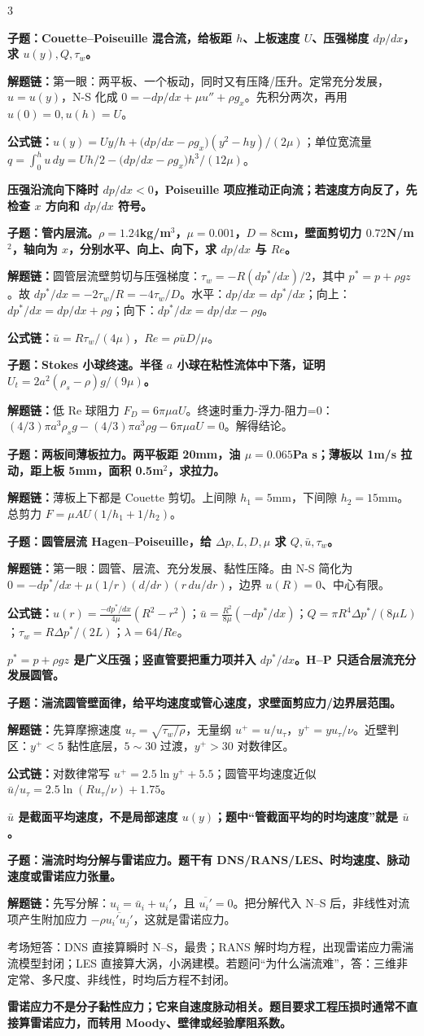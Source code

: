 \documentclass[a4paper]{article}
\newcommand{\qt}[1]{\vspace{0.04pt}\colorbox{Q}{\parbox{\dimexpr\linewidth-2\fboxsep}{\color{white}\bfseries #1}}\par}
\newcommand{\ans}[1]{\colorbox{G}{\parbox{\dimexpr\linewidth-2\fboxsep}{#1}}\par}
\newcommand{\warn}[1]{\colorbox{Y}{\parbox{\dimexpr\linewidth-2\fboxsep}{\color{E}\bfseries #1}}\par}
\newcommand{\chain}[1]{{\color{A}\bfseries 解题链：}#1\par}
\newcommand{\form}[1]{{\color{M}\bfseries 公式链：}#1\par}
\begin{document}
\begin{multicols}{3}
\qt{子题：Couette--Poiseuille 混合流，给板距 $h$、上板速度 $U$、压强梯度 $dp/dx$，求 $u(y),Q,\tau_w$。}
\chain{第一眼：两平板、一个板动，同时又有压降/压升。定常充分发展，$u=u(y)$，N-S 化成 $0=-dp/dx+\mu u''+\rho g_x$。先积分两次，再用 $u(0)=0,u(h)=U$。}
\form{$u(y)=Uy/h+\big(dp/dx-\rho g_x\big)(y^2-hy)/(2\mu)$；单位宽流量 $q=\int_0^hu\,dy=Uh/2-\big(dp/dx-\rho g_x\big)h^3/(12\mu)$。}
\warn{压强沿流向下降时 $dp/dx<0$，Poiseuille 项应推动正向流；若速度方向反了，先检查 $x$ 方向和 $dp/dx$ 符号。}

\qt{子题：管内层流。$\rho=1.24$kg/m$^3$，$\mu=0.001$，$D=8$cm，壁面剪切力 $0.72$N/m$^2$，轴向为 $x$，分别水平、向上、向下，求 $dp/dx$ 与 $Re$。}
\chain{圆管层流壁剪切与压强梯度：$\tau_w=-R(dp^*/dx)/2$，其中 $p^*=p+\rho gz$。故 $dp^*/dx=-2\tau_w/R=-4\tau_w/D$。水平：$dp/dx=dp^*/dx$；向上：$dp^*/dx=dp/dx+\rho g$；向下：$dp^*/dx=dp/dx-\rho g$。}
\form{$\bar u=R\tau_w/(4\mu)$，$Re=\rho\bar uD/\mu$。}

\qt{子题：Stokes 小球终速。半径 $a$ 小球在粘性流体中下落，证明 $U_t=2a^2(\rho_s-\rho)g/(9\mu)$。}
\chain{低 Re 球阻力 $F_D=6\pi\mu aU$。终速时重力-浮力-阻力=0：$(4/3)\pi a^3\rho_sg-(4/3)\pi a^3\rho g-6\pi\mu aU=0$。解得结论。}

\qt{子题：两板间薄板拉力。两平板距 20mm，油 $\mu=0.065$Pa s；薄板以 1m/s 拉动，距上板 5mm，面积 0.5m$^2$，求拉力。}
\chain{薄板上下都是 Couette 剪切。上间隙 $h_1=5$mm，下间隙 $h_2=15$mm。总剪力 $F=\mu AU(1/h_1+1/h_2)$。}

\qt{子题：圆管层流 Hagen--Poiseuille，给 $\Delta p,L,D,\mu$ 求 $Q,\bar u,\tau_w$。}
\chain{第一眼：圆管、层流、充分发展、黏性压降。由 N-S 简化为 $0=-dp^*/dx+\mu(1/r)(d/dr)(r\,du/dr)$，边界 $u(R)=0$、中心有限。}
\form{$u(r)=\frac{-dp^*/dx}{4\mu}(R^2-r^2)$；$\bar u=\frac{R^2}{8\mu}(-dp^*/dx)$；$Q=\pi R^4\Delta p^*/(8\mu L)$；$\tau_w=R\Delta p^*/(2L)$；$\lambda=64/Re$。}
\warn{$p^*=p+\rho gz$ 是广义压强；竖直管要把重力项并入 $dp^*/dx$。H--P 只适合层流充分发展圆管。}

\qt{子题：湍流圆管壁面律，给平均速度或管心速度，求壁面剪应力/边界层范围。}
\chain{先算摩擦速度 $u_\tau=\sqrt{\tau_w/\rho}$，无量纲 $u^+=u/u_\tau$，$y^+=yu_\tau/\nu$。近壁判区：$y^+<5$ 黏性底层，$5\sim30$ 过渡，$y^+>30$ 对数律区。}
\form{对数律常写 $u^+=2.5\ln y^+ +5.5$；圆管平均速度近似 $\bar u/u_\tau=2.5\ln(Ru_\tau/\nu)+1.75$。}
\warn{$\bar u$ 是截面平均速度，不是局部速度 $u(y)$；题中“管截面平均的时均速度”就是 $\bar u$。}

\qt{子题：湍流时均分解与雷诺应力。题干有 DNS/RANS/LES、时均速度、脉动速度或雷诺应力张量。}
\chain{先写分解：$u_i=\bar u_i+u_i'$，且 $\overline{u_i'}=0$。把分解代入 N--S 后，非线性对流项产生附加应力 $-\rho\overline{u_i'u_j'}$，这就是雷诺应力。}
\ans{考场短答：DNS 直接算瞬时 N--S，最贵；RANS 解时均方程，出现雷诺应力需湍流模型封闭；LES 直接算大涡，小涡建模。若题问“为什么湍流难”，答：三维非定常、多尺度、非线性，时均后方程不封闭。}
\warn{雷诺应力不是分子黏性应力；它来自速度脉动相关。题目要求工程压损时通常不直接算雷诺应力，而转用 Moody、壁律或经验摩阻系数。}


\end{multicols}
\end{document}
